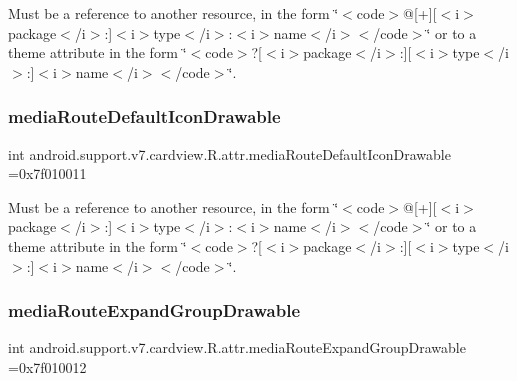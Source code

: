 Must be a reference to another resource, in the form \char`\"{}$<$code$>$@\mbox{[}+\mbox{]}\mbox{[}$<$i$>$package$<$/i$>$\+:\mbox{]}$<$i$>$type$<$/i$>$\+:$<$i$>$name$<$/i$>$$<$/code$>$\char`\"{} or to a theme attribute in the form \char`\"{}$<$code$>$?\mbox{[}$<$i$>$package$<$/i$>$\+:\mbox{]}\mbox{[}$<$i$>$type$<$/i$>$\+:\mbox{]}$<$i$>$name$<$/i$>$$<$/code$>$\char`\"{}. \mbox{\label{classandroid_1_1support_1_1v7_1_1cardview_1_1R_1_1attr_aac78087806f7d50220dec324ed71c00c}} 
\subsubsection{\texorpdfstring{media\+Route\+Default\+Icon\+Drawable}{mediaRouteDefaultIconDrawable}}
{\footnotesize\ttfamily int android.\+support.\+v7.\+cardview.\+R.\+attr.\+media\+Route\+Default\+Icon\+Drawable =0x7f010011\hspace{0.3cm}{\ttfamily [static]}}

Must be a reference to another resource, in the form \char`\"{}$<$code$>$@\mbox{[}+\mbox{]}\mbox{[}$<$i$>$package$<$/i$>$\+:\mbox{]}$<$i$>$type$<$/i$>$\+:$<$i$>$name$<$/i$>$$<$/code$>$\char`\"{} or to a theme attribute in the form \char`\"{}$<$code$>$?\mbox{[}$<$i$>$package$<$/i$>$\+:\mbox{]}\mbox{[}$<$i$>$type$<$/i$>$\+:\mbox{]}$<$i$>$name$<$/i$>$$<$/code$>$\char`\"{}. \mbox{\label{classandroid_1_1support_1_1v7_1_1cardview_1_1R_1_1attr_a15f9e2bf0c30dc8a103c38725ba9ff0f}} 
\subsubsection{\texorpdfstring{media\+Route\+Expand\+Group\+Drawable}{mediaRouteExpandGroupDrawable}}
{\footnotesize\ttfamily int android.\+support.\+v7.\+cardview.\+R.\+attr.\+media\+Route\+Expand\+Group\+Drawable =0x7f010012\hspace{0.3cm}{\ttfamily [static]}}

